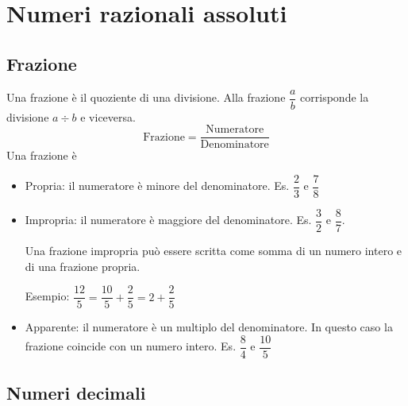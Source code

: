 \chapter{Numeri razionali assoluti}
\label{cha:NumeriRazionaliAssoluti}

\section{Frazione}
\label{sec:fraczioniNumRazASS}
Una frazione è il quoziente di una divisione. Alla frazione $\dfrac{a}{b}$ corrisponde la divisione $a\div b$ e viceversa.
\[
\text{Frazione}=
\dfrac{\text{Numeratore}}{\text{Denominatore}}
\]
Una frazione è\begin{itemize}
	\item Propria: il numeratore è minore del denominatore. Es. $\dfrac{2}{3}$ e $\dfrac{7}{8}$
	\item Impropria: il numeratore è maggiore del denominatore. Es. $\dfrac{3}{2}$ e $\dfrac{8}{7}$.
	
	Una frazione impropria può essere scritta come somma di un numero intero e di una frazione propria. 
	
	Esempio: $\dfrac{12}{5}=\dfrac{10}{5}+\dfrac{2}{5}=2+\dfrac{2}{5}$ 
	\item Apparente: il numeratore è un multiplo del denominatore. In questo caso la frazione coincide con un numero intero. Es. $\dfrac{8}{4}$ e $\dfrac{10}{5}$
\end{itemize}
\section{Numeri decimali}
\label{Numeri decimali}

